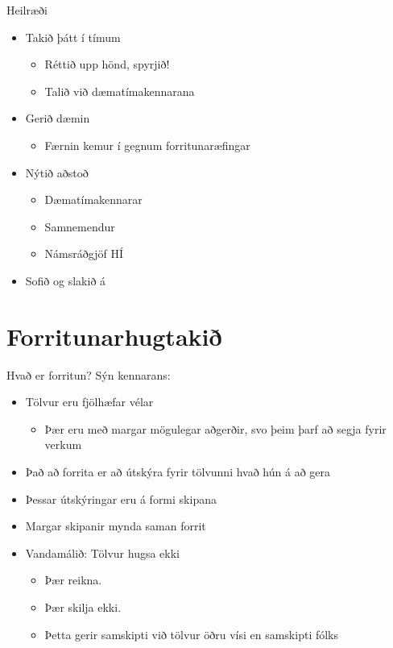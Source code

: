 \documentclass{beamer}
\begin{document}
\begin{frame}{Heilræði}
\pause
\begin{itemize}
 \item Takið þátt í tímum\pause
 \begin{itemize}
  \item Réttið upp hönd, spyrjið! \pause
  \item Talið við dæmatímakennarana
 \end{itemize}
 \item Gerið dæmin \pause
 \begin{itemize}
  \item Færnin kemur í gegnum forritunaræfingar \pause
 \end{itemize}
 \item Nýtið aðstoð
 \begin{itemize}
  \item Dæmatímakennarar
  \item Samnemendur
  \item Námsráðgjöf HÍ \pause
 \end{itemize}
 \item Sofið og slakið á
\end{itemize}
\end{frame}

\section{Forritunarhugtakið}

\begin{frame}{Hvað er forritun?}
\pause
Sýn kennarans:
\begin{itemize}
  \item Tölvur eru fjölhæfar vélar
  \begin{itemize}
   \item Þær eru með margar mögulegar aðgerðir, svo þeim þarf að segja fyrir verkum
  \end{itemize}
  \item Það að forrita er að útskýra fyrir tölvunni hvað hún á að gera
  \item Þessar útskýringar eru á formi skipana
  \item Margar skipanir mynda saman forrit
  \item Vandamálið: Tölvur hugsa ekki
  \begin{itemize}
   \item Þær reikna.
   \item Þær skilja ekki.
   \item Þetta gerir samskipti við tölvur öðru vísi en samskipti fólks
  \end{itemize}
 \end{itemize}
\end{frame}
\end{document}
